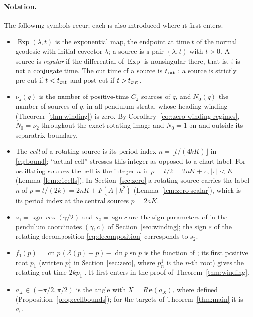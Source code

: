 \documentclass[11pt,a4paper]{article}
\theoremstyle{remark}\newtheorem{remark}[theorem]{Remark}
\newcommand{\sn}{\operatorname{sn}}
\newcommand{\cn}{\operatorname{cn}}
\newcommand{\dn}{\operatorname{dn}}
\newcommand{\ee}{\mathbf e}
\begin{document}
\paragraph{Notation.}
The following symbols recur; each is also introduced where it first
enters.
\begin{itemize}[nosep,leftmargin=*]
\item $\operatorname{Exp}(\lambda,t)$ is the exponential map, the
 endpoint at time $t$ of the normal geodesic with initial covector
 $\lambda$; a source is a pair $(\lambda,t)$ with $t>0$. A source is
 \emph{regular} if the differential of $\operatorname{Exp}$ is
 nonsingular there, that is, $t$ is not a conjugate time. The cut time
 of a source is $t_{\rm cut}$ \cite{SS}; a source is strictly pre-cut if
 $t<t_{\rm cut}$ and post-cut if $t>t_{\rm cut}$.
\item $\nu_2(q)$ is the number of positive-time $C_2$ sources of $q$,
 and $N_0(q)$ the number of sources of $q$, in all pendulum strata,
 whose heading winding (Theorem~\ref{thm:winding}) is zero. By
 Corollary~\ref{cor:zero-winding-regimes}, $N_0=\nu_2$ throughout
 the exact rotating image and $N_0=1$ on and outside its separatrix boundary.
\item The \emph{cell} of a rotating source is its period index
 $n=\lfloor t/(4kK)\rfloor$ in \eqref{eq:bound}; ``actual cell''
 stresses this integer as opposed to a chart label. For oscillating
 sources the cell is the integer $n$ in $p=t/2=2nK+r$, $|r|<K$
 (Lemma~\ref{lem:c1cells}). In Section~\ref{sec:zero} a rotating source
 carries the label $n$ of $p=t/(2k)=2nK+F(A\mid k^2)$
 (Lemma~\ref{lem:zero-scalar}), which is its period index at the
 central sources $p=2nK$.
\item $s_1=\operatorname{sgn}\cos(\gamma/2)$ and
 $s_2=\operatorname{sgn}c$ are the sign parameters of \cite{MS,SC} in
 the pendulum coordinates $(\gamma,c)$ of Section~\ref{sec:winding};
 the sign $\varepsilon$ of the rotating decomposition
 \eqref{eq:decomposition} corresponds to $s_2$.
\item $f_1(p)=\cn p\,(\mathcal E(p)-p)-\dn p\sn p$ is the function of
 \cite[(5.12)]{MS}; its first positive root $p_1$ (written $p_1^1$ in
 Section~\ref{sec:zero}, where $p_n^1$ is the $n$-th root) gives the
 rotating cut time $2kp_1$ \cite{SS}. It first enters in the proof of
 Theorem~\ref{thm:winding}.
\item $a_X\in(-\pi/2,\pi/2)$ is the angle with $X=R\,\ee(a_X)$, where
 defined (Proposition~\ref{prop:cellbounds}); for the targets of
 Theorem~\ref{thm:main} it is $a_0$.

\end{itemize}
\end{document}
